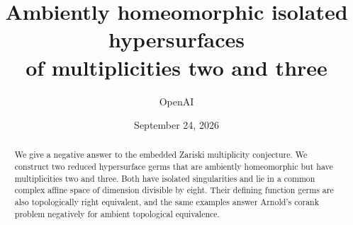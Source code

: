 \documentclass[11pt]{article}
\title{Ambiently homeomorphic isolated hypersurfaces\\of multiplicities two and three}
\author{OpenAI}
\date{September 24, 2026}
\begin{document}
\maketitle
\begin{abstract}
We give a negative answer to the embedded Zariski multiplicity conjecture.
We construct two reduced hypersurface germs that are ambiently homeomorphic
but have multiplicities two and three. Both have isolated singularities and
lie in a common complex affine space of dimension divisible by eight. Their
defining function germs are also topologically right equivalent, and the same
examples answer Arnold's corank problem negatively for ambient topological equivalence.
\end{abstract}






\appendix

\setlength{\bibsep}{6pt plus 1pt minus 1pt}


\end{document}
